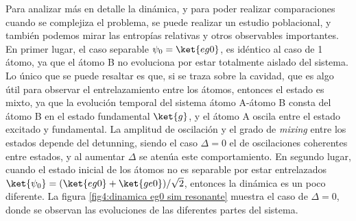 Para analizar más en detalle la dinámica, y para poder realizar comparaciones cuando se complejiza el problema, se puede realizar un estudio poblacional, y también podemos mirar las entropías relativas y otros observables importantes.
En primer lugar, el caso separable $\psi_0=\ket{eg0}$, es idéntico al caso de 1 átomo, ya que el átomo B no evoluciona por estar totalmente aislado del sistema. Lo único que se puede resaltar es que, si se traza sobre la cavidad, que es algo útil para observar el entrelazamiento entre los átomos, entonces el estado es mixto, ya que la evolución temporal del sistema átomo A-átomo B consta del átomo B en el estado fundamental $\ket{g}$, y el átomo A oscila entre el estado excitado y fundamental. La amplitud de oscilación y el grado de \textit{mixing} entre los estados depende del detunning, siendo el caso $\Delta=0$ el de oscilaciones coherentes entre estados, y al aumentar $\Delta$ se atenúa este comportamiento.
En segundo lugar, cuando el estado inicial de los átomos no es separable por estar entrelazados $\ket{\psi_0}=(\ket{eg0} + \ket{ge0})/\sqrt{2}$, entonces la dinámica es un poco diferente. La figura \ref{fig4:dinamica eg0 sim resonante} muestra el caso de $\Delta=0$, donde se observan las evoluciones de las diferentes partes del sistema.

